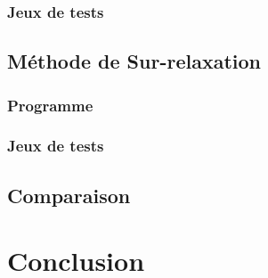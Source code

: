 \documentclass{report}
\begin{document}
      \subsection{Jeux de tests}
  	\newpage
  	\section{Méthode de Sur-relaxation}
  	  \subsection{Programme}
        
      \newpage
      \subsection{Jeux de tests}
     \newpage
     \section{Comparaison}
  \chapter*{Conclusion}
\end{document}
